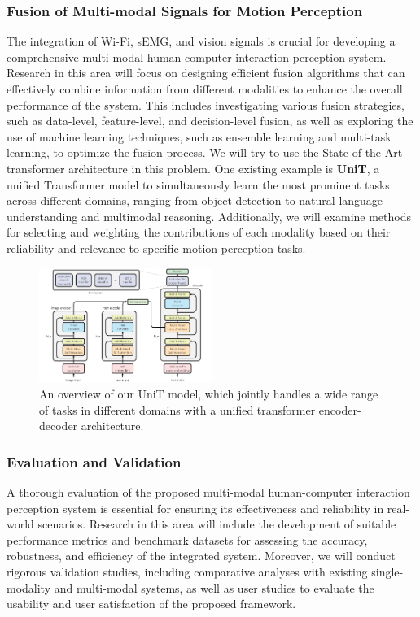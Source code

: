 \documentclass[12pt, a4paper]{article}
\begin{document}
\subsubsection{Fusion of Multi-modal Signals for Motion Perception}

The integration of Wi-Fi, sEMG, and vision signals is crucial for developing a comprehensive multi-modal human-computer interaction perception system. Research in this area will focus on designing efficient fusion algorithms that can effectively combine information from different modalities to enhance the overall performance of the system. This includes investigating various fusion strategies, such as data-level, feature-level, and decision-level fusion, as well as exploring the use of machine learning techniques, such as ensemble learning and multi-task learning, to optimize the fusion process. We will try to use the State-of-the-Art transformer architecture in this problem. One existing example is \textbf{UniT}\cite{hu2021unit}, a unified Transformer model to simultaneously learn the most prominent tasks across different domains, ranging from object detection to natural language understanding and multimodal reasoning. Additionally, we will examine methods for selecting and weighting the contributions of each modality based on their reliability and relevance to specific motion perception tasks.

\begin{figure}[ht!]
    \centering
    \includegraphics[width=0.5\textwidth]{image/unit.png}
    \caption{An overview of our UniT model, which jointly handles a wide range of tasks in different domains with a unified transformer encoder-decoder architecture.}
    \label{fig:unit}
\end{figure}

\subsubsection{Evaluation and Validation}

A thorough evaluation of the proposed multi-modal human-computer interaction perception system is essential for ensuring its effectiveness and reliability in real-world scenarios. Research in this area will include the development of suitable performance metrics and benchmark datasets for assessing the accuracy, robustness, and efficiency of the integrated system. Moreover, we will conduct rigorous validation studies, including comparative analyses with existing single-modality and multi-modal systems, as well as user studies to evaluate the usability and user satisfaction of the proposed framework.
\end{document}
